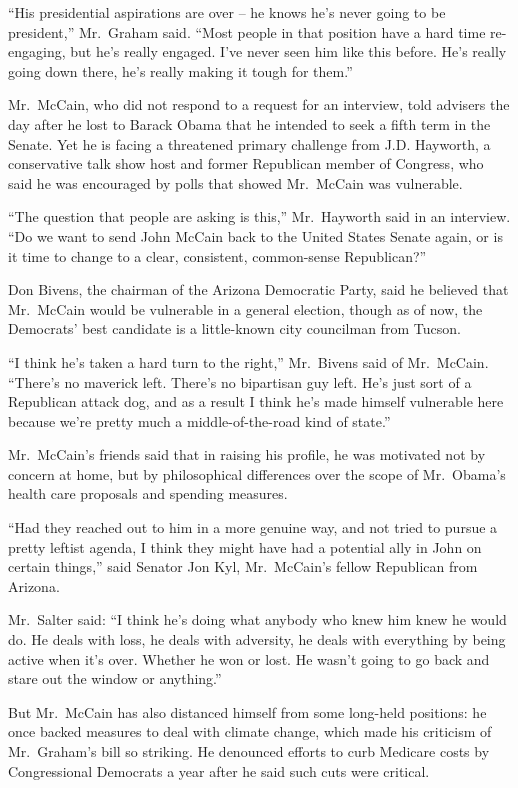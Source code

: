 ﻿\documentclass[12pt]{article}
\begin{document}
``His presidential aspirations are over -- he knows he's never going to be president,'' Mr.~Graham
said. ``Most people in that position have a hard time re-engaging, but he's really engaged. I've
never seen him like this before. He's really going down there, he's really making it tough for
them.''

Mr.~McCain, who did not respond to a request for an interview, told advisers the day after he lost
to Barack Obama that he intended to seek a fifth term in the Senate. Yet he is facing a threatened
primary challenge from J.D. Hayworth, a conservative talk show host and former Republican member of
Congress, who said he was encouraged by polls that showed Mr.~McCain was vulnerable.

``The question that people are asking is this,'' Mr.~Hayworth said in an interview. ``Do we want to
send John McCain back to the United States Senate again, or is it time to change to a clear,
consistent, common-sense Republican?''

Don Bivens, the chairman of the Arizona Democratic Party, said he believed that Mr.~McCain would be
vulnerable in a general election, though as of now, the Democrats' best candidate is a little-known
city councilman from Tucson.

``I think he's taken a hard turn to the right,'' Mr.~Bivens said of Mr.~McCain. ``There's no
maverick left. There's no bipartisan guy left. He's just sort of a Republican attack dog, and as a
result I think he's made himself vulnerable here because we're pretty much a middle-of-the-road kind
of state.''

Mr.~McCain's friends said that in raising his profile, he was motivated not by concern at home, but
by philosophical differences over the scope of Mr.~Obama's health care proposals and spending
measures.

``Had they reached out to him in a more genuine way, and not tried to pursue a pretty leftist
agenda, I think they might have had a potential ally in John on certain things,'' said Senator Jon
Kyl, Mr.~McCain's fellow Republican from Arizona.

Mr.~Salter said: ``I think he's doing what anybody who knew him knew he would do. He deals with
loss, he deals with adversity, he deals with everything by being active when it's over. Whether he
won or lost. He wasn't going to go back and stare out the window or anything.''

But Mr.~McCain has also distanced himself from some long-held positions: he once backed measures to
deal with climate change, which made his criticism of Mr.~Graham's bill so striking. He denounced
efforts to curb Medicare costs by Congressional Democrats a year after he said such cuts were
critical.
\end{document}
